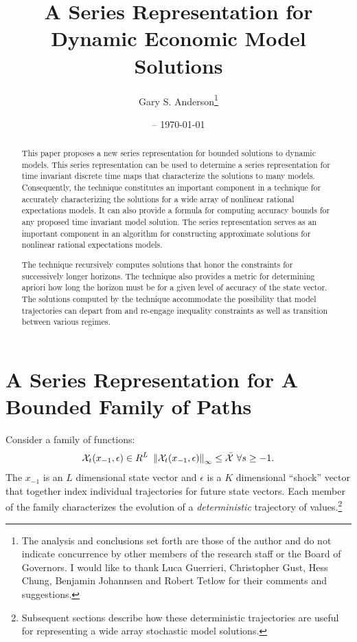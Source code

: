 \documentclass[12pt]{article}
\title{A Series Representation for Dynamic Economic Model Solutions}
\date{\currenttime -- \today }
\author{Gary S. Anderson\thanks{The analysis and conclusions set forth are those of the author and do not indicate concurrence by other members of the research staff or the Board of Governors. I would like to thank Luca Guerrieri, Christopher Gust, Hess Chung, Benjamin Johannsen  and Robert Tetlow for their comments and suggestions. }}
\begin{document}
\maketitle

\begin{abstract}


 
This paper proposes a new series representation for bounded
solutions to dynamic models. 
This series representation can be used to
determine a series representation for 
time invariant discrete time maps that characterize the solutions
to many models.  Consequently, the technique constitutes an important component
in a technique for accurately characterizing the solutions for a 
wide array of nonlinear rational expectations models.
It can also  provide a formula
for computing accuracy bounds for any proposed time invariant model solution.
The series representation serves as an important component in an algorithm 
for constructing approximate solutions for nonlinear rational expectations
models.




  The technique recursively computes  solutions that honor the constraints for successively longer horizons. The technique also provides a metric for determining apriori how long the horizon must be for a given level of accuracy of the
state vector. The solutions computed by the technique accommodate the possibility that model trajectories can depart from and re-engage inequality constraints as well as transition between various regimes.
  



\end{abstract}

 \newpage
 \tableofcontents
 \newpage






\section{A Series Representation for A Bounded Family of Paths}
\label{sec:seri-repr-bound}

Consider a family of functions:
 \begin{gather}
   \mathcal{X}_{t}(x_{-1},\epsilon) \in{R^L}\,\,\left\lVert\mathcal{X}_{t}(x_{-1},\epsilon)\right\rVert_\infty  \le \bar{\mathcal{X}}\,\,\forall s\ge -1 \label{fFamily}.
 \end{gather}
The $x_{-1}$ is an  $L$ dimensional state vector and $\epsilon$ is a $K$ dimensional ``shock'' vector that together index
individual trajectories for future state vectors.  
Each member of the family characterizes the evolution of a {\em deterministic} trajectory of values.\footnote{Subsequent sections describe how these deterministic trajectories are useful for representing a wide array stochastic model solutions.}
\end{document}
